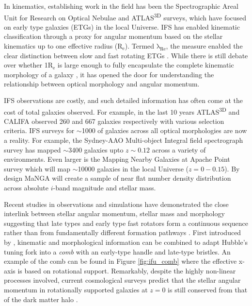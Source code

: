 In kinematics, establishing work in the field has been the Spectrographic Areal Unit for Research on Optical Nebulae \citep[SAURON;][]{sauron} and ATLAS\textsuperscript{3D} \citep{atlas3d} surveys, which have focused on early type galaxies (ETGs) in the local Universe. IFS has enabled kinematic classification through a proxy for angular momentum based on the stellar kinematics up to one effective radius ($\mathrm{R_e}$). Termed $\mathrm{\lambda_{Re}}$, the measure enabled the clear distinction between slow and fast rotating ETGs \citep{emsellem2007, emsellem2011}. While there is still debate over whether 1$\mathrm{R_{e}}$ is large enough to fully encapsulate the complete kinematic morphology of a galaxy \citep{foster2013, arnold2014}, it has opened the door for understanding the relationship between optical morphology and angular momentum. 

IFS observations are costly, and such detailed information has often come at the cost of total galaxies observed. For example, in the last 10 years ATLAS\textsuperscript{3D} and CALIFA \citep{califa} observed 260 and 667 galaxies respectively with various selection criteria. IFS surveys for $\sim$1000 of galaxies across all optical morphologies are now a reality. For example, the Sydney-AAO  Multi-object  Integral  field  spectrograph  survey \citep[][]{croom2012, bryant2015} has mapped $\sim$3400 galaxies upto $z\sim0.12$ across a variety of environments. Even larger is the Mapping Nearby Galaxies at Apache Point \citep[MaNGA;][]{bundy2015, blanton2017} survey which will map $\sim$10000 galaxies in the local Universe ($z=0-0.15$). By design MaNGA will create a sample of near flat number density distribution across absolute $i$-band magnitude and stellar mass.

Recent studies in observations and simulations have demonstrated the close interlink between stellar angular momentum, stellar mass and morphology suggesting that late types and early type fast rotators form a continuous sequence rather than from fundamentally different formation pathways \citep[][]{cortese2016, lagos2017, graham2018}. First introduced by \citet{cappellari2011}, kinematic and morphological information can be combined to adapt Hubble's tuning fork into a \textit{comb} with an early-type handle and late-type bristles. An example of the comb can be found in Figure \ref{fig:ifu_comb} where the effective x-axis is based on rotational support. Remarkably, despite the highly non-linear processes involved, current cosmological surveys predict that the stellar angular momentum in rotationally supported galaxies at $z=0$ is still conserved from that of the dark matter halo \citep[e.g.][]{genel2015}. 

